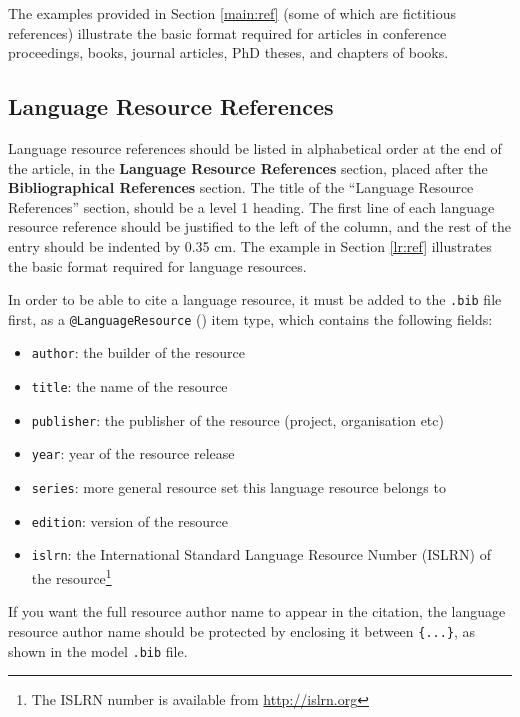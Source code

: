 \documentclass{lrec}
\begin{document}
The examples provided in Section \cref{main:ref} (some of which are fictitious
references) illustrate the basic format required for articles in conference
proceedings, books, journal articles, PhD theses, and chapters of books.

\subsection{Language Resource References}

Language resource references should be listed in alphabetical order at the end
of the article, in the \textbf{Language Resource References} section, placed after
the \textbf{Bibliographical References} section. The title of the ``Language Resource
References'' section, should be a level 1 heading. The first line of each
language resource reference should be justified to the left of the column, and
the rest of the entry should be indented by 0.35 cm. The example in Section
\cref{lr:ref} illustrates the basic format required for language resources.

In order to be able to cite a language resource, it must be added to
the \texttt{.bib} file first, as a \texttt{@LanguageResource} () item type, which
contains the following fields:

\begin{itemize}
    \item{\texttt{author}: the builder of the resource}
    \item{\texttt{title}: the name of the resource}
    \item{\texttt{publisher}: the publisher of the resource (project,
          organisation etc)}
    \item{\texttt{year}: year of the resource release}
    \item{\texttt{series}: more general resource set this language resource
          belongs to}
    \item{\texttt{edition}: version of the resource}
    \item{\texttt{islrn}: the International Standard Language Resource Number
          (ISLRN) of the resource\footnote{The ISLRN number is available from
          \url{http://islrn.org}}}
\end{itemize}

If you want the full resource author name to appear in the citation, the
language resource author name should be protected by enclosing it between
\texttt{\{...\}}, as shown in the model \texttt{.bib} file.
\end{document}
